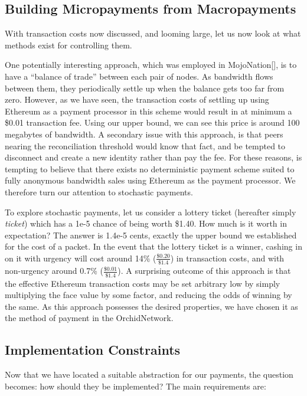 \documentclass{article}
\newcommand{\orchid}{Orchid}
\newcommand{\Orchid}{\orchid}
\begin{document}
\subsection{Building Micropayments from Macropayments}

With transaction costs now discussed, and looming large, let us now look at what methods exist for controlling them.

One potentially interesting approach, which was employed in MojoNation[\cite{mojonation}], is to have a ``balance of trade'' between each pair of nodes. As bandwidth flows between them, they periodically settle up when the balance gets too far from zero. However, as we have seen, the transaction costs of settling up using Ethereum as a payment processor in this scheme would result in at minimum a \$0.01 transaction fee. Using our upper bound, we can see this price is around 100 megabytes of bandwidth. A secondary issue with this approach, is that peers nearing the reconciliation threshold would know that fact, and be tempted to disconnect and create a new identity rather than pay the fee. For these reasons, is tempting to believe that there exists no deterministic payment scheme suited to fully anonymous bandwidth sales using Ethereum as the payment processor. We therefore turn our attention to stochastic payments.

To explore stochastic payments, let us consider a lottery ticket (hereafter simply \emph{ticket}) which has a 1e-5 chance of being worth \$1.40. How much is it worth in expectation? The answer is 1.4e-5 cents, exactly the upper bound we established for the cost of a packet. In the event that the lottery ticket is a winner, cashing in on it with urgency will cost around 14\% ($\frac{\$0.20}{\$1.4}$) in transaction costs, and with non-urgency around 0.7\% ($\frac{\$0.01}{\$1.4}$). A surprising outcome of this approach is that the effective Ethereum transaction costs may be set arbitrary low by simply multiplying the face value by some factor, and reducing the odds of winning by the same. As this approach possesses the desired properties, we have chosen it as the method of payment in the \Orchid Network.

\subsection{Implementation Constraints}

Now that we have located a suitable abstraction for our payments, the question becomes: how should they be implemented? The main requirements are:
\end{document}
